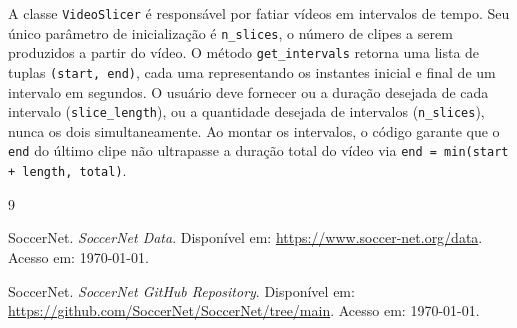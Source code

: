 \documentclass[12pt, a4paper]{article}
\begin{document}
A classe \texttt{VideoSlicer} é responsável por fatiar vídeos em intervalos de tempo. Seu único parâmetro de inicialização é \texttt{n\_slices}, o número de clipes a serem produzidos a partir do vídeo. O método \texttt{get\_intervals} retorna uma lista de tuplas \texttt{(start, end)}, cada uma representando os instantes inicial e final de um intervalo em segundos. O usuário deve fornecer ou a duração desejada de cada intervalo (\texttt{slice\_length}), ou a quantidade desejada de intervalos (\texttt{n\_slices}), nunca os dois simultaneamente. Ao montar os intervalos, o código garante que o \texttt{end} do último clipe não ultrapasse a duração total do vídeo via \texttt{end = min(start + length, total)}.


\begin{thebibliography}{9}

SoccerNet.
\textit{SoccerNet Data}.
Disponível em: \url{https://www.soccer-net.org/data}.
Acesso em: \today.

SoccerNet.
\textit{SoccerNet GitHub Repository}.
Disponível em: \url{https://github.com/SoccerNet/SoccerNet/tree/main}.
Acesso em: \today.

\end{thebibliography}
\end{document}
